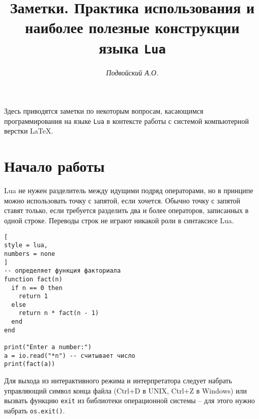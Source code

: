 \documentclass[%
	11pt,
	a4paper,
	utf8,
		]{article}
\begin{document}
\title{Заметки. Практика использования и наиболее полезные конструкции языка \texttt{Lua}}

\author{\itshape Подвойский А.О.}

\date{}
\maketitle

\thispagestyle{fancy}

Здесь приводятся заметки по некоторым вопросам, касающимся программирования на языке \texttt{Lua} в контексте работы с системой компьютерной верстки \LaTeX.



\tableofcontents

\section{Начало работы}

Lua не нужен разделитель между идущими подряд операторами, но в принципе можно использовать точку с запятой, если хочется. Обычно точку с запятой ставят только, если требуется разделить два и более операторов, записанных в одной строке. Переводы строк не играют никакой роли в синтаксисе Lua.

\begin{lstlisting}[
style = lua,
numbers = none	
]
-- определяет функция факториала
function fact(n)
  if n == 0 then
    return 1
  else
    return n * fact(n - 1)
  end
end

print("Enter a number:")
a = io.read("*n") -- считывает число
print(fact(a))
\end{lstlisting}

Для выхода из интерактивного режима и интерпретатора следует набрать управляющий символ конца файла (\textsf{Ctrl+D} в UNIX, \textsf{Ctrl+Z} в Windows) или вызвать функцию \texttt{exit} из библиотеки операционной системы -- для этого нужно набрать \texttt{os.exit()}.




\begin{thebibliography}{99}
	\bibitem{hostmann:scala-2013}{{\emph{Иерузалимски Р.} Программирование на языке Lua, 2013. -- 413~с. }
\end{thebibliography}
\end{document}
